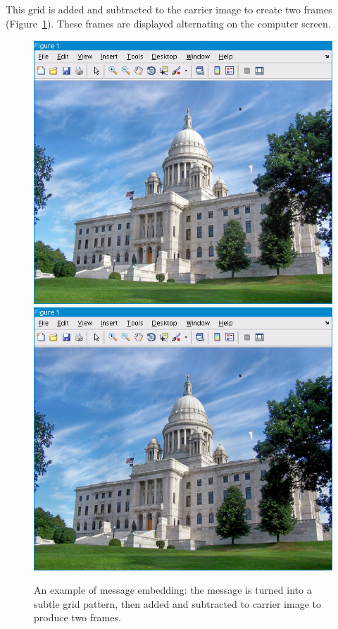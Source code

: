 \documentclass[11pt, letterpaper]{article}
\begin{document}
This grid is added and subtracted to the carrier image to create two frames (Figure~\ref{fig:message}). These frames are displayed alternating on the computer screen.

\begin{figure}[hbtp]
\centering
\includegraphics[scale=0.5]{img/message1.png}
\includegraphics[scale=0.5]{img/message2.png}
\caption{An example of message embedding: the message is turned into a subtle grid pattern, then added and subtracted to carrier image to produce two frames.}
\label{fig:message}
\end{figure}
\end{document}
